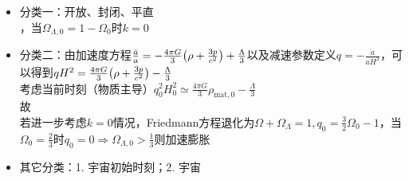 \begin{itemize}
	\item 分类一：开放、封闭、平直 \\ 
	，当$\Omega_{\Lambda, 0} = 1 - \Omega_{0}$时$k = 0$
	
	\item 分类二：由加速度方程$\frac{\ddot{a}}{a} = - \frac{4 \pi G}{3} \qty(\rho + \frac{3p}{c^2}) + \frac{\Lambda}{3}$以及减速参数定义$q = - \frac{\ddot{a}}{a H^2}$，可以得到$q H^2 = \frac{4 \pi G}{3} \qty(\rho + \frac{3p}{c^2}) - \frac{\Lambda}{3}$ \\
	考虑当前时刻（物质主导）$q_0^2 H_0^2 \simeq \frac{4 \pi G}{3} \rho_{\text{mat}, 0} - \frac{\Lambda}{3}$ \\ 故 \\
	若进一步考虑$k=0$情况，Friedmann方程退化为$\Omega + \Omega_{\Lambda} = 1, q_0 = \frac{3}{2} \Omega_0 - 1$，当$\Omega_{0} = \frac{2}{3}$时$q_0 = 0 \Rightarrow \Omega_{\Lambda, 0} > \frac{1}{3}$则加速膨胀
	
	\item 其它分类：1. 宇宙初始时刻；2. 宇宙
\end{itemize}

